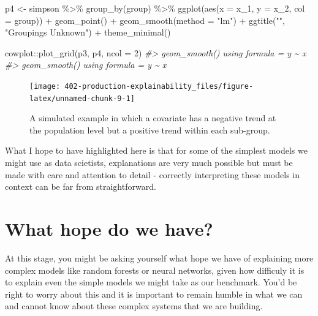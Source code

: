 \documentclass[
  12pt,
]{book}
\newenvironment{Shaded}{\begin{snugshade}}{\end{snugshade}}
\newcommand{\AttributeTok}[1]{\textcolor[rgb]{0.77,0.63,0.00}{#1}}
\newcommand{\CommentTok}[1]{\textcolor[rgb]{0.56,0.35,0.01}{\textit{#1}}}
\newcommand{\DecValTok}[1]{\textcolor[rgb]{0.00,0.00,0.81}{#1}}
\newcommand{\FunctionTok}[1]{\textcolor[rgb]{0.00,0.00,0.00}{#1}}
\newcommand{\NormalTok}[1]{#1}
\newcommand{\OtherTok}[1]{\textcolor[rgb]{0.56,0.35,0.01}{#1}}
\newcommand{\SpecialCharTok}[1]{\textcolor[rgb]{0.00,0.00,0.00}{#1}}
\newcommand{\StringTok}[1]{\textcolor[rgb]{0.31,0.60,0.02}{#1}}
\begin{document}
\begin{Shaded}
\begin{Highlighting}[]
\NormalTok{p4 }\OtherTok{\textless{}{-}}\NormalTok{ simpson }\SpecialCharTok{\%\textgreater{}\%} 
  \FunctionTok{group\_by}\NormalTok{(group) }\SpecialCharTok{\%\textgreater{}\%} 
  \FunctionTok{ggplot}\NormalTok{(}\FunctionTok{aes}\NormalTok{(}\AttributeTok{x =}\NormalTok{ x\_1, }\AttributeTok{y =}\NormalTok{ x\_2, }\AttributeTok{col =}\NormalTok{ group)) }\SpecialCharTok{+}
  \FunctionTok{geom\_point}\NormalTok{() }\SpecialCharTok{+} 
  \FunctionTok{geom\_smooth}\NormalTok{(}\AttributeTok{method =} \StringTok{"lm"}\NormalTok{) }\SpecialCharTok{+} 
  \FunctionTok{ggtitle}\NormalTok{(}\StringTok{""}\NormalTok{, }\StringTok{"Groupings Unknown"}\NormalTok{) }\SpecialCharTok{+}
  \FunctionTok{theme\_minimal}\NormalTok{()}

\NormalTok{cowplot}\SpecialCharTok{::}\FunctionTok{plot\_grid}\NormalTok{(p3, p4, }\AttributeTok{ncol =} \DecValTok{2}\NormalTok{)}
\CommentTok{\#\textgreater{} \textasciigrave{}geom\_smooth()\textasciigrave{} using formula = \textquotesingle{}y \textasciitilde{} x\textquotesingle{}}
\CommentTok{\#\textgreater{} \textasciigrave{}geom\_smooth()\textasciigrave{} using formula = \textquotesingle{}y \textasciitilde{} x\textquotesingle{}}
\end{Highlighting}
\end{Shaded}

\begin{figure}

{\centering \texttt{[image: 402-production-explainability\_files/figure-latex/unnamed-chunk-9-1]} 

}

\caption{A simulated example in which a covariate has a negative trend at the population level but a positive trend within each sub-group.}\label{fig:unnamed-chunk-9}
\end{figure}

What I hope to have highlighted here is that for some of the simplest models we might use as data scietists, explanations are very much possible but must be made with care and attention to detail - correctly interpreting these models in context can be far from straightforward.

\hypertarget{what-hope-do-we-have}{%
\section{What hope do we have?}\label{what-hope-do-we-have}}

At this stage, you might be asking yourself what hope we have of explaining more complex models like random forests or neural networks, given how difficuly it is to explain even the simple models we might take as our benchmark. You'd be right to worry about this and it is important to remain humble in what we can and cannot know about these complex systems that we are building.
\end{document}
